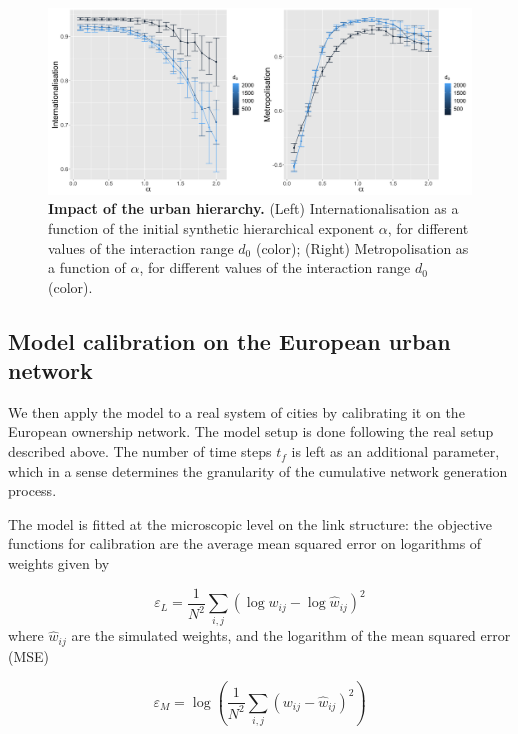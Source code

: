 \documentclass[10pt,letterpaper]{article}
\begin{document}
\begin{figure}
    \begin{center}
        \includegraphics[width=\linewidth]{figures/Fig7.png}
    \end{center}
    \caption{\textbf{Impact of the urban hierarchy.} (Left) Internationalisation as a function of the initial synthetic hierarchical exponent $\alpha$, for different values of the interaction range $d_0$ (color); (Right) Metropolisation as a function of $\alpha$, for different values of the interaction range $d_0$ (color).\label{fig:fig7}}
\end{figure}



\subsection*{Model calibration on the European urban network}

We then apply the model to a real system of cities by calibrating it on the European ownership network. The model setup is done following the real setup described above. The number of time steps $t_f$ is left as an additional parameter, which in a sense determines the granularity of the cumulative network generation process.

The model is fitted at the microscopic level on the link structure: the objective functions for calibration are the average mean squared error on logarithms of weights given by

\begin{equation}
\varepsilon_L = \frac{1}{N^2} \sum_{i,j} \left(\log w_{ij} - \log \hat{w}_{ij} \right)^2
\end{equation}
where $\hat{w}_{ij}$ are the simulated weights, and the logarithm of the mean squared error (MSE)

\begin{equation}
\varepsilon_M = \log\left(\frac{1}{N^2} \sum_{i,j} \left(w_{ij} - \hat{w}_{ij}\right)^2 \right)
\end{equation}
\end{document}
